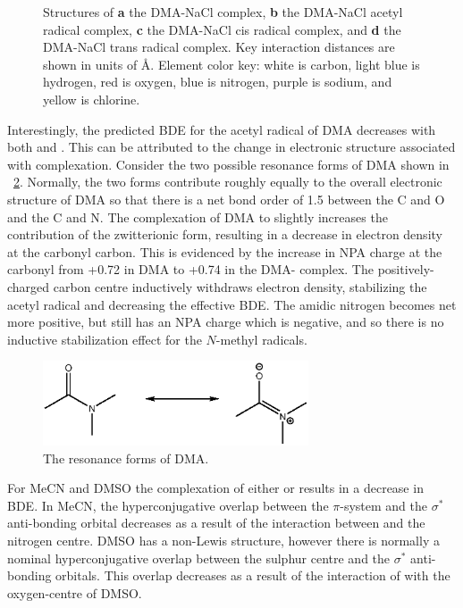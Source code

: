 \begin{figure}[!htbp]
	\caption[Structures of the DMA-NaCl complex and associated radical complexes.]{Structures of \textbf{a} the DMA-NaCl complex, \textbf{b} the DMA-NaCl acetyl radical complex, \textbf{c} the DMA-NaCl cis radical complex, and \textbf{d} the DMA-NaCl trans radical complex. Key interaction distances are shown in units of \AA. Element color key: white is carbon, light blue is hydrogen, red is oxygen, blue is nitrogen, purple is sodium, and yellow is chlorine.}
	\label{fig:dma-na-cl}
\end{figure}

Interestingly, the predicted BDE for the acetyl radical of DMA decreases with both  and . This can be attributed to the change in electronic structure associated with complexation. Consider the two possible resonance forms of DMA shown in ~\ref{fig:dma-res}. Normally, the two forms contribute roughly equally to the overall electronic structure of DMA so that there is a net bond order of 1.5 between the C and O and the C and N. The complexation of DMA to  slightly increases the contribution of the zwitterionic form, resulting in a decrease in electron density at the carbonyl carbon. This is evidenced by the increase in NPA charge at the carbonyl from +0.72 in DMA to +0.74 in the DMA- complex. The positively-charged carbon centre inductively withdraws electron density, stabilizing the acetyl radical and decreasing the effective BDE. The amidic nitrogen becomes net more positive, but still has an NPA charge which is negative, and so there is no inductive stabilization effect for the $N$-methyl radicals.

\begin{figure}[!htpb]
  \centering
  \includegraphics[width=0.7\textwidth]{figures/DMA-resonance.eps}
  \caption{The resonance forms of DMA.}
  \label{fig:dma-res}
\end{figure}

For MeCN and DMSO the complexation of either  or  results in a decrease in  BDE. In MeCN, the hyperconjugative overlap between the  $\pi$-system and the  $\sigma^*$ anti-bonding orbital decreases as a result of the interaction between  and the nitrogen centre. DMSO has a non-Lewis structure, however there is normally a nominal hyperconjugative overlap between the sulphur centre and the  $\sigma^*$ anti-bonding orbitals. This overlap decreases as a result of the interaction of  with the oxygen-centre of DMSO.

